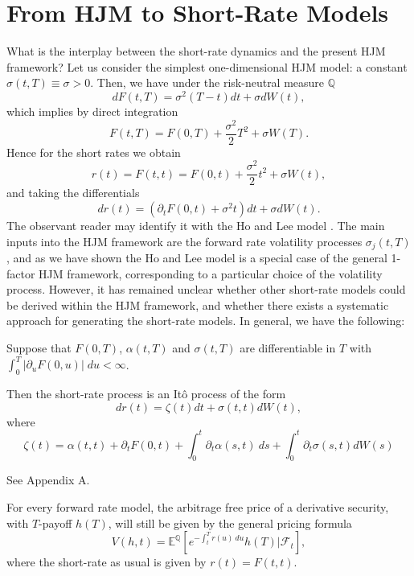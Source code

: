 \section{From HJM to Short-Rate Models}
What is the interplay between the short-rate dynamics and the present
HJM framework? Let us consider the simplest one-dimensional HJM model:
a constant $\sigma(t,T)\equiv \sigma>0$. Then, we have under the
risk-neutral measure $\mathbb{Q}$
$$
dF(t,T)=\sigma^2(T-t)dt + \sigma dW(t),
$$
which implies by direct integration
$$
F(t,T)=F(0,T)+\frac{\sigma^2}{2}T^2 + \sigma W(T).
$$
Hence for the short rates we obtain
$$
r(t)=F(t,t)=F(0,t)+\frac{\sigma^2}{2}t^2+\sigma W(t),
$$
and taking the differentials
$$
dr(t)=(\partial_t F(0,t)+\sigma^2 t)dt +\sigma dW(t).
$$
The observant reader may identify it with the Ho and Lee model
\cite{HL:1986}. The main inputs into the HJM framework are the forward
rate volatility processes $\sigma_j(t,T)$, and as we have shown the Ho
and Lee model is a special case of the general 1-factor HJM framework,
corresponding to a particular choice of the volatility
process. However, it has remained unclear whether other short-rate
models could be derived within the HJM framework, and whether there
exists a systematic approach for generating the short-rate models. In
general, we have the following:\begin{propos}
 Suppose that $F(0,T)$, $\alpha(t,T)$ and $\sigma(t,T)$ are
 differentiable in $T$ with $\int_0^T |\partial_u
 F(0,u)|\;du<\infty$.

Then the short-rate process is an It\^o process of the form
\begin{equation}
\label{SRMHJM}
dr(t)=\zeta(t) dt+\sigma(t,t) dW(t),
\end{equation}
where
\begin{equation}
\label{driftSRMHJM}
\zeta(t)=\alpha(t,t)+\partial_t F(0,t)+\int_0^t \partial_t
\alpha(s,t)\: ds+\int_0^t \partial_t \sigma(s,t)dW(s)
\end{equation}
\end{propos}
\begin{demo}
See Appendix A.
\end{demo}
\begin{rmk}
For every forward rate model, the arbitrage free price of a derivative
security, with $T$-payoff $h(T)$, will still be given by the general
pricing formula
$$
V(h,t)=\mathbb{E}^\mathbb{Q}\left[e^{-\int_t^T r(u)\:du} h(T)
  \big|\mathcal{F}_t\right], 
$$
where the short-rate as usual is given by $r(t)=F(t,t)$. 
\end{rmk}
